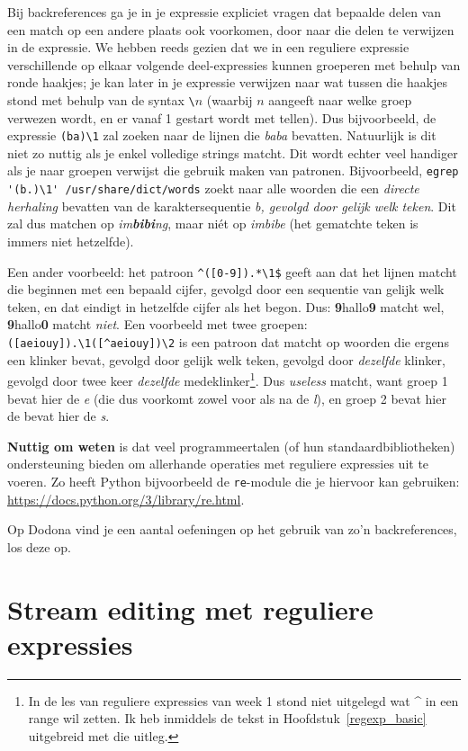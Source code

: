 \documentclass[a4paper,twoside,openany]{memoir}
\begin{document}
Bij backreferences ga je in je expressie expliciet vragen dat bepaalde delen van
een match op een andere plaats ook voorkomen, door naar die delen te verwijzen
in de expressie. We hebben reeds gezien dat we in een reguliere expressie
verschillende op elkaar volgende deel-expressies kunnen groeperen
met behulp van ronde haakjes; je kan later in je expressie
verwijzen naar wat tussen die haakjes stond met behulp van de syntax \verb!\!$n$
(waarbij $n$ aangeeft naar welke groep verwezen wordt, en er vanaf 1 gestart
wordt met tellen). Dus bijvoorbeeld, de expressie \verb!(ba)\1! zal zoeken naar
de lijnen die \emph{baba} bevatten. Natuurlijk is dit niet zo nuttig als je
enkel volledige strings matcht. Dit wordt echter veel handiger als je naar
groepen verwijst die gebruik maken van patronen. Bijvoorbeeld, \verb!egrep '(b.)\1' /usr/share/dict/words! zoekt naar alle woorden die een \emph{directe
herhaling} bevatten van de karaktersequentie \emph{b, gevolgd door gelijk welk
teken}. Dit zal dus matchen op \emph{im\textbf{bibi}ng}, maar niét op
\emph{imbibe} (het gematchte teken is immers niet hetzelfde).

Een ander voorbeeld: het patroon \verb!^([0-9]).*\1$! geeft aan dat het lijnen matcht die beginnen
met een bepaald cijfer, gevolgd door een sequentie van gelijk welk teken, en dat eindigt in hetzelfde cijfer
als het begon. Dus: \textbf{9}hallo\textbf{9} matcht wel, \textbf{9}hallo\textbf{0} matcht \emph{niet}.
Een voorbeeld met twee groepen: \verb!([aeiouy]).\1([^aeiouy])\2! is een patroon dat matcht op woorden
die ergens een klinker bevat, gevolgd door gelijk welk teken, gevolgd door \emph{dezelfde} klinker, gevolgd
door twee keer \emph{dezelfde} medeklinker\footnote{In de les van reguliere expressies
van week 1 stond niet uitgelegd wat \^{} in een range wil zetten. Ik heb inmiddels
de tekst in Hoofdstuk~\ref{regexp_basic} uitgebreid met die uitleg.}.
Dus \emph{useless} matcht, want groep 1 bevat hier de \emph{e} (die dus voorkomt zowel voor als na de \emph{l}), en groep
2 bevat hier de bevat hier de \emph{s}.

\textbf{Nuttig om weten} is dat veel programmeertalen (of hun
standaardbibliotheken) ondersteuning bieden om allerhande operaties met
reguliere expressies uit te voeren. Zo heeft Python bijvoorbeeld de
\verb!re!-module die je hiervoor kan gebruiken:
\url{https://docs.python.org/3/library/re.html}.

Op Dodona vind je een aantal oefeningen op het gebruik van zo'n backreferences,
los deze op.

\section{Stream editing met reguliere expressies}
\end{document}
